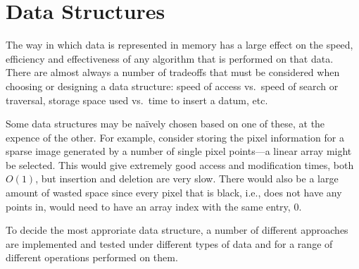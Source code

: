 
\part{Data Structures}
\label{prt:data_structures}

The way in which data is represented in memory has a large effect on the speed,
efficiency and effectiveness of any algorithm that is performed on that data.
There are almost always a number of tradeoffs that must be considered when
choosing or designing a data structure: speed of access vs.\ speed of search or
traversal, storage space used vs.\ time to insert a datum, etc.

Some data structures may be na\"ively chosen based on one of these, at the
expence of the other. For example, consider storing the pixel information for a
sparse image generated by a number of single pixel points---a linear array
might be selected. This would give extremely good access and modification
times, both $O(1)$, but insertion and deletion are very slow. There would also
be a large amount of wasted space since every pixel that is black, i.e., does
not have any points in, would need to have an array index with the same entry,
$0$.

To decide the most approriate data structure, a number of different approaches
are implemented and tested under different types of data and for a range of
different operations performed on them.
